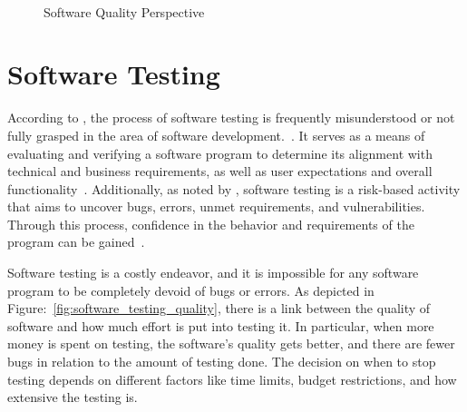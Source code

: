 \begin{figure}[H]
    \centering
    {}
    \caption{Software Quality Perspective}~\label{fig:software_quality_perspective}
\end{figure}



\section{Software Testing}

According to \citeauthor{whittaker2000software}, the process of software testing
is frequently misunderstood or not fully grasped in the area of software
development.~\cite{whittaker2000software}. It serves as a means of
evaluating and verifying a software program to determine its alignment with technical and business
requirements, as well as user expectations and overall functionality~\cite{bentley2005software}.
Additionally, as noted by \citeauthor{jamil2016software}, software testing is a risk-based activity
that aims to uncover bugs, errors, unmet requirements, and vulnerabilities. Through this process,
confidence in the behavior and requirements of the program can be gained~\cite{jamil2016software}.

Software testing is a costly endeavor, and it is impossible for any software program to be completely
devoid of bugs or errors. As depicted in Figure:~\ref{fig:software_testing_quality},
there is a link between the quality of software and how much effort is put into
testing it. In particular, when more money is spent on testing, the software's
quality gets better, and there are fewer bugs in relation to the amount of
testing done. The decision on when to stop testing depends on different factors
like time limits, budget restrictions, and how extensive the testing is.



